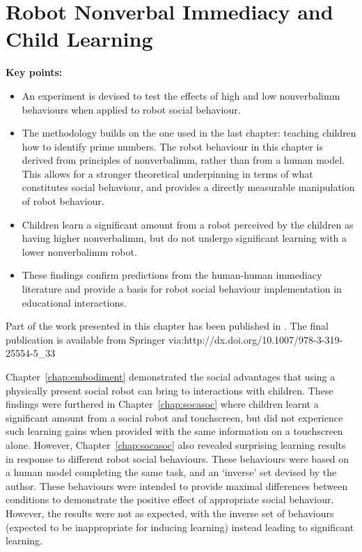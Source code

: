 \chapter[Robot Nonverbal Immediacy and Child Learning]{Robot Nonverbal Immediacy and \texorpdfstring{\\}{} Child Learning} \label{chap:nviexperiment} 

\begin{framed}
	\textbf{Key points:}
	
	\begin{itemize}
	\item An experiment is devised to test the effects of high and low \gls{nonverbalimm} behaviours when applied to robot social behaviour.
	\item The methodology builds on the one used in the last chapter: teaching children how to identify prime numbers. The robot behaviour in this chapter is derived from principles of \gls{nonverbalimm}, rather than from a human model. This allows for a stronger theoretical underpinning in terms of what constitutes social behaviour, and provides a directly measurable manipulation of robot behaviour.
	\item Children learn a significant amount from a robot perceived by the children as having higher \gls{nonverbalimm}, but do not undergo significant \gls{learning} with a lower \gls{nonverbalimm} robot.
	\item These findings confirm predictions from the human-human \gls{immediacy} literature and provide a basis for robot social behaviour implementation in educational interactions.
	\end{itemize}
\end{framed}

Part of the work presented in this chapter has been published in \cite{kennedy2015higher}. The final publication is available from Springer via:\newline http://dx.doi.org/10.1007/978-3-319-25554-5\_33

\newpage
Chapter~\ref{chap:embodiment} demonstrated the social advantages that using a physically present social robot can bring to interactions with children. These findings were furthered in Chapter~\ref{chap:socasoc} where children learnt a significant amount from a social robot and touchscreen, but did not experience such \gls{learning} gains when provided with the same information on a touchscreen alone. However, Chapter~\ref{chap:socasoc} also revealed surprising \gls{learning} results in response to different robot social behaviours. These behaviours were based on a human model completing the same task, and an `inverse' set devised by the author. These behaviours were intended to provide maximal differences between conditions to demonstrate the positive effect of appropriate social behaviour. However, the results were not as expected, with the inverse set of behaviours (expected to be inappropriate for inducing \gls{learning}) instead leading to significant \gls{learning}.

